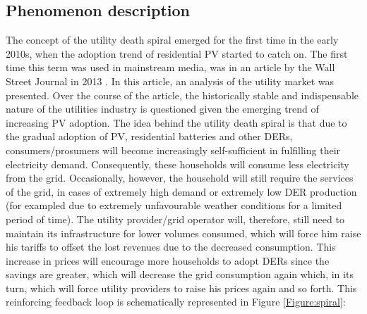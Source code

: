 \subsection{Phenomenon description}
The concept of the utility death spiral emerged for the first time in the early 2010s, when the adoption trend of residential PV started to catch on. The first time this term was used in mainstream media, was in an article by the Wall Street Journal in 2013 \cite{wsj}. In this article, an analysis of the utility market was presented. Over the course of the article, the historically stable and indispensable nature of the utilities industry is questioned given the emerging trend of increasing PV adoption. The idea behind the utility death spiral is that due to the gradual adoption of PV, residential batteries and other DERs, consumers/prosumers will become increasingly self-sufficient in fulfilling their electricity demand. Consequently, these households will consume less electricity from the grid. Occasionally, however, the household will still require the services of the grid, in cases of extremely high demand or extremely low DER production (for exampled due to extremely unfavourable weather conditions for a limited period of time). The utility provider/grid operator will, therefore, still need to maintain its infrastructure for lower volumes consumed, which will force him raise his tariffs to offset the lost revenues due to the decreased consumption. This increase in prices will encourage more households to adopt DERs since the savings are greater, which will decrease the grid consumption again which, in its turn, which will force utility providers to raise his prices again and so forth. This reinforcing feedback loop is schematically represented in Figure \ref{Figure:spiral}:

